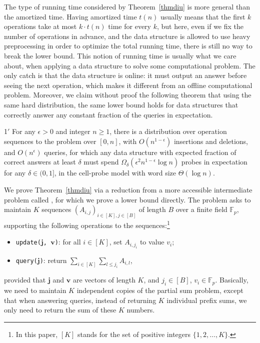 \documentclass[11pt]{article}
\begin{document}
The type of running time considered by Theorem~\ref{thmdiu} is more general than the amortized time. Having amortized time $t(n)$ usually means that the first $k$ operations take at most $k\cdot t(n)$ time for every $k$, but here, even if we fix the number of operations in advance, and the data structure is allowed to use heavy preprocessing in order to optimize the total running time, there is still no way to break the lower bound. This notion of running time is usually what we care about, when applying a data structure to solve some computational problem. The only catch is that the data structure is online: it must output an answer before seeing the next operation, which makes it different from an offline computational problem. Moreover, we claim without proof the following theorem that using the same hard distribution, the same lower bound holds for data structures that correctly answer any constant fraction of the queries in expectation. 

\begin{customthm}{1$'$}
	For any $\epsilon>0$ and integer $n\geq 1$, there is a distribution over operation sequences to the \diu{} problem over $[0, n]$, with $O(n^{1-\epsilon})$ insertions and deletions, and $O(n^{\epsilon})$ queries, for which any data structure with expected fraction of correct answers at least $\delta$ must spend $\Omega_{\delta}(\epsilon^2 n^{1-\epsilon}\log n)$ probes in expectation for any $\delta\in (0, 1]$, in the cell-probe model with word size $\Theta(\log n)$. 
\end{customthm}

We prove Theorem~\ref{thmdiu} via a reduction from a more accessible intermediate problem called \emph{\bps{}}, for which we prove a lower bound directly. The \bps{} problem asks to maintain $K$ sequences $(A_{i,j})_{i\in [K],j\in [B]}$ of length $B$ over a finite field $\mathbb{F}_p$, supporting the following operations to the sequences:\footnote{In this paper, $[K]$ stands for the set of positive integers $\{1,2,\ldots,K\}$.}

\begin{itemize}
	\item
		\verb+update(+$\mathbf{j}$\verb+, +$\mathbf{v}$\verb+)+: for all $i\in [K]$, set $A_{i,j_i}$ to value $v_i$;
	\item
		\verb+query(+$\mathbf{j}$\verb+)+: return $\sum_{i\in [K]}\sum_{l\leq j_i} A_{i,l}$,
\end{itemize}
provided that $\mathbf{j}$ and $\mathbf{v}$ are vectors of length $K$, and $j_i\in [B]$, $v_i\in \mathbb{F}_p$. Basically, we need to maintain $K$ independent copies of the partial sum problem, except that when answering queries, instead of returning $K$ individual prefix sums, we only need to return the sum of these $K$ numbers. 
\end{document}
